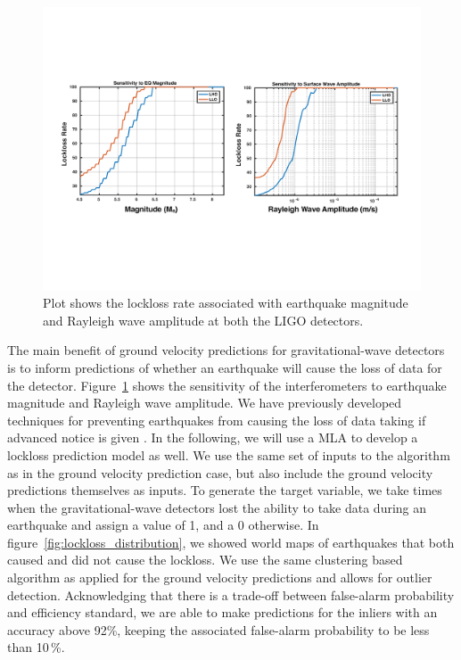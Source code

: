 \documentclass[preprint, aps, showpacs]{revtex4-1}
\begin{document}
\begin{figure}[!htb]
  \includegraphics[width=\textwidth]{./plots/Lockloss_Sensitivity.pdf}
 \caption{Plot shows the lockloss rate associated with earthquake magnitude and Rayleigh wave amplitude at both the LIGO detectors.}
 \label{fig:lockloss_sensitivity}
\end{figure}


The main benefit of ground velocity predictions for gravitational-wave detectors is to inform predictions of whether an earthquake will cause the loss of data for the detector. Figure~\ref{fig:lockloss_sensitivity} shows the sensitivity of the interferometers to earthquake magnitude and Rayleigh wave amplitude.
We have previously developed techniques for preventing earthquakes from causing the loss of data taking if advanced notice is given \cite{BiWa2018}.
In the following, we will use a MLA to develop a lockloss prediction model as well. 
We use the same set of inputs to the algorithm as in the ground velocity prediction case, but also include the ground velocity predictions themselves as inputs.
To generate the target variable, we take times when the gravitational-wave detectors lost the ability to take data during an earthquake and assign a value of 1, and a 0 otherwise.
In figure~\ref{fig:lockloss_distribution}, we showed world maps of earthquakes that both caused and did not cause the lockloss. We use the same clustering based algorithm as applied for the ground velocity predictions and allows for outlier detection.
Acknowledging that there is a trade-off between false-alarm probability and efficiency standard, 
we are able to make predictions for the inliers with an accuracy above 92\%, keeping the associated false-alarm probability to be less than 10\,\%.
\end{document}
